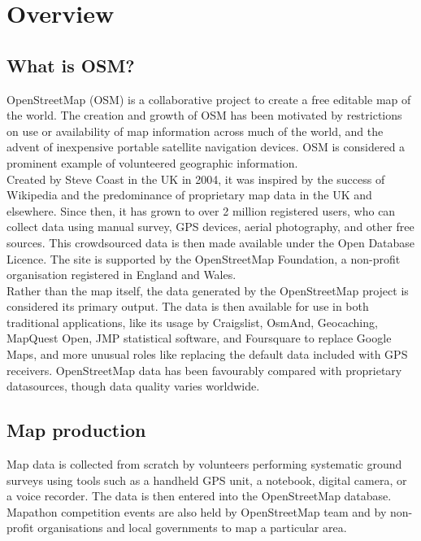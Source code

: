 \section{Overview}
\subsection{What is OSM?}
OpenStreetMap (OSM) is a collaborative project to create a free editable map of the world. The creation and growth of OSM has been motivated by restrictions on use or availability of map information across much of the world, and the advent of inexpensive portable satellite navigation devices. OSM is considered a prominent example of volunteered geographic information.\\

Created by Steve Coast in the UK in 2004, it was inspired by the success of Wikipedia and the predominance of proprietary map data in the UK and elsewhere. Since then, it has grown to over 2 million registered users, who can collect data using manual survey, GPS devices, aerial photography, and other free sources. This crowdsourced data is then made available under the Open Database Licence. The site is supported by the OpenStreetMap Foundation, a non-profit organisation registered in England and Wales.\\

Rather than the map itself, the data generated by the OpenStreetMap project is considered its primary output. The data is then available for use in both traditional applications, like its usage by Craigslist, OsmAnd, Geocaching, MapQuest Open, JMP statistical software, and Foursquare to replace Google Maps, and more unusual roles like replacing the default data included with GPS receivers. OpenStreetMap data has been favourably compared with proprietary datasources, though data quality varies worldwide.

\subsection{ Map production}
Map data is collected from scratch by volunteers performing systematic ground surveys using tools such as a handheld GPS unit, a notebook, digital camera, or a voice recorder. The data is then entered into the OpenStreetMap database. Mapathon competition events are also held by OpenStreetMap team and by non-profit organisations and local governments to map a particular area.\\

